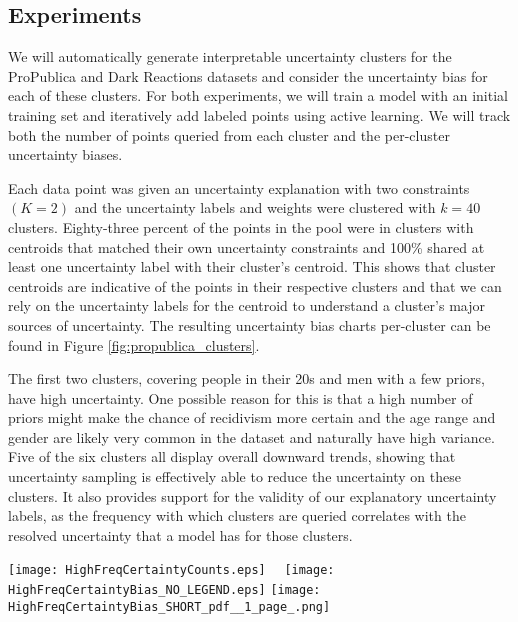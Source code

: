 \subsection{Experiments}

We will automatically generate interpretable uncertainty clusters for the ProPublica and Dark Reactions datasets and consider the uncertainty bias for each of these clusters.  For both experiments, we will train a model with an initial training set and iteratively add labeled points using active learning. We will track both the number of points queried from each cluster and the per-cluster uncertainty biases.

Each data point was given an uncertainty explanation with two constraints $(K=2)$ and the uncertainty labels and weights were clustered with $k=40$ clusters. Eighty-three percent of the points in the pool were in clusters with centroids that matched their own uncertainty constraints and 100\% shared at least one uncertainty label with their cluster's centroid. This shows that cluster centroids are indicative of the points in their respective clusters and that we can rely on the uncertainty labels for the centroid to understand a cluster's major sources of uncertainty. The resulting uncertainty bias charts per-cluster can be found in Figure \ref{fig:propublica_clusters}.

The first two clusters, covering people in their 20s and men with a few priors, have high uncertainty. One possible reason for this is that a high number of priors might make the chance of recidivism more certain and the age range and gender are likely very common in the dataset and naturally have high variance. Five of the six clusters all display overall downward trends, showing that uncertainty sampling is effectively able to reduce the uncertainty on these clusters.  It also provides support for the validity of our explanatory uncertainty labels, as the frequency with which clusters are queried correlates with the resolved uncertainty that a model has for those clusters.

\begin{figure*}[h]
\centering
\texttt{[image: HighFreqCertaintyCounts.eps]}~~
\texttt{[image: HighFreqCertaintyBias\_NO\_LEGEND.eps]}
\texttt{[image: HighFreqCertaintyBias\_SHORT\_pdf\_\_1\_page\_.png]}
\caption{Left: Counts of labeled points from each of the top six labeled clusters as queries are made. Right: The corresponding per-cluster uncertainty bias values.}
\label{fig:propublica_clusters}
\end{figure*}



